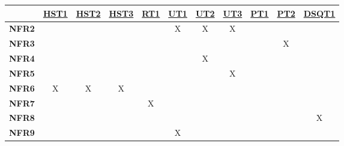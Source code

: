 \documentclass[12pt, titlepage]{article}
\begin{document}
\begin{table}[H]
  \centering
  \begin{tabular}{|c|c|c|c|c|c|c|c|c|c|c|}
    \hline
                   & \hyperref[HST1]{HST1} & \hyperref[HST2]{HST2} & \hyperref[HST3]{HST3} & \hyperref[RT1]{RT1} & \hyperref[UT1]{UT1} & \hyperref[UT2]{UT2} & \hyperref[UT3]{UT3} & \hyperref[PT1]{PT1} & \hyperref[PT2]{PT2} & \hyperref[DSQT1]{DSQT1} \\
    \hline
    \textbf{NFR2}  &                       &                       &                       &                     & X                   & X                   & X                   &                     &                     &                         \\ \hline
    \textbf{NFR3}  &                       &                       &                       &                     &                     &                     &                     &                     & X                   &                         \\ \hline
    \textbf{NFR4}  &                       &                       &                       &                     &                     & X                   &                     &                     &                     &                         \\ \hline
    \textbf{NFR5}  &                       &                       &                       &                     &                     &                     & X                   &                     &                     &                         \\ \hline
    \textbf{NFR6}  & X                     & X                     & X                    &                     &                     &                     &                     &                     &                     &                         \\ \hline
    \textbf{NFR7}  &                       &                       &                       & X                   &                     &                     &                     &                     &                     &                         \\ \hline
    \textbf{NFR8}  &                       &                       &                       &                     &                     &                     &                     &                     &                     & X                       \\ \hline
    \textbf{NFR9}  &                       &                       &                       &                     & X                   &                     &                     &                     &                     &                         \\ \hline

\end{tabular}
\end{table}
\end{document}
